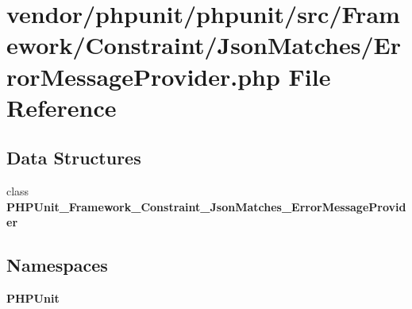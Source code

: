 \section{vendor/phpunit/phpunit/src/\+Framework/\+Constraint/\+Json\+Matches/\+Error\+Message\+Provider.php File Reference}
\label{_error_message_provider_8php}
\subsection*{Data Structures}
\begin{DoxyCompactItemize}
\item 
class {\bf P\+H\+P\+Unit\+\_\+\+Framework\+\_\+\+Constraint\+\_\+\+Json\+Matches\+\_\+\+Error\+Message\+Provider}
\end{DoxyCompactItemize}
\subsection*{Namespaces}
\begin{DoxyCompactItemize}
\item 
 {\bf P\+H\+P\+Unit}
\end{DoxyCompactItemize}
